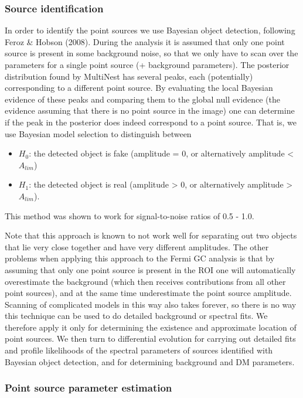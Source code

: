 \documentclass{article}
\begin{document}
\subsubsection{Source identification}

In order to identify the point sources we use Bayesian object detection, following Feroz \& Hobson (2008). During the analysis it is assumed that only one point source is present in some background noise, so that we only have to scan over the parameters for a single point source (+ background parameters). The posterior distribution found by MultiNest has several peaks, each (potentially) corresponding to a different point source. By evaluating the local Bayesian evidence of these peaks and comparing them to the global null evidence (the evidence assuming that there is no point source in the image) one can determine if the peak in the posterior does indeed correspond to a point source. That is, we use Bayesian model selection to distinguish between
\begin{itemize}
\item $H_0$: the detected object is fake (amplitude  = 0, or alternatively amplitude < $A_{lim}$)
\item $H_1$: the detected object is real (amplitude > 0, or alternatively amplitude > $A_{lim}$).
\end{itemize}

This method was shown to work for signal-to-noise ratios of 0.5 - 1.0.  

Note that this approach is known to not work well for separating out two objects that lie very close together and have very different amplitudes.  The other problems when applying this approach to the Fermi GC analysis is that by assuming that only one point source is present in the ROI one will automatically overestimate the background (which then receives contributions from all other point sources), and at the same time underestimate the point source amplitude. Scanning of complicated models in this way also takes forever, so there is no way this technique can be used to do detailed background or spectral fits.  We therefore apply it only for determining the existence and approximate location of point sources.  We then turn to differential evolution for carrying out detailed fits and profile likelihoods of the spectral parameters of sources identified with Bayesian object detection, and for determining background and DM parameters.

\subsubsection{Point source parameter estimation}
\end{document}
